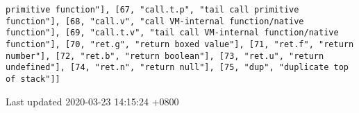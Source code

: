 \documentclass[11pt]{article}
\begin{document}
\begin{verbatim}
primitive function"], [67, "call.t.p", "tail call primitive function"], [68, "call.v", "call VM-internal function/native function"], [69, "call.t.v", "tail call VM-internal function/native function"], [70, "ret.g", "return boxed value"], [71, "ret.f", "return number"], [72, "ret.b", "return boolean"], [73, "ret.u", "return undefined"], [74, "ret.n", "return null"], [75, "dup", "duplicate top of stack"]]
\end{verbatim}

\label{org8222156}

\label{orgc2bb649}
Last updated 2020-03-23 14:15:24 +0800
\end{document}
